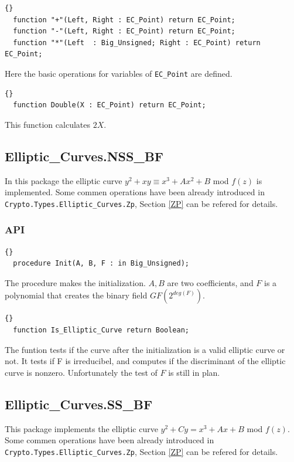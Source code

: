 \hhline

\begin{lstlisting}{}
  function "+"(Left, Right : EC_Point) return EC_Point;
  function "-"(Left, Right : EC_Point) return EC_Point;
  function "*"(Left  : Big_Unsigned; Right : EC_Point) return EC_Point;
\end{lstlisting}
Here the basic operations for variables of \texttt{EC\_Point} are defined.

\hhline

\begin{lstlisting}{}
  function Double(X : EC_Point) return EC_Point;
\end{lstlisting}
This function calculates $2X$.\\


\subsection{Elliptic\_Curves.NSS\_BF}\label{NSS}
In this package the elliptic curve $y^2 + xy \equiv x^3 + Ax^2 + B$
mod $f(z)$ is implemented. Some commen operations have been already
introduced in \texttt{Crypto.Types.Elliptic\_Curves.Zp}, Section
\ref{ZP} can be refered for details.
\subsubsection*{API}
\begin{lstlisting}{}
  procedure Init(A, B, F : in Big_Unsigned);
\end{lstlisting}
The procedure makes the initialization. $A,B$ are two coefficients,
and $F$ is a polynomial that creates the binary field
$GF(2^{deg(F)})$.

\hhline

\begin{lstlisting}{}
  function Is_Elliptic_Curve return Boolean;
\end{lstlisting}
The funtion tests if the curve after the initialization is a valid
elliptic curve or not. It tests if F is irreducibel, and computes if
the discriminant of the elliptic curve is nonzero. Unfortunately the
test of $F$ is still in plan.\\
\subsection{Elliptic\_Curves.SS\_BF}\label{SS}
This package implements the elliptic curve $y^2 + Cy = x^3 + Ax + B$
mod $f(z)$. Some commen operations have been already introduced in
\texttt{Crypto.Types.Elliptic\_Curves.Zp}, Section \ref{ZP} can be
refered for details.
